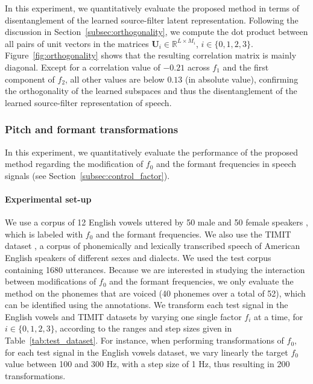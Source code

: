 \documentclass[review]{elsarticle}
\begin{document}
In this experiment, we quantitatively evaluate the proposed method in terms of disentanglement of the learned source-filter latent representation. Following the discussion in Section~\ref{subsec:orthogonality}, we compute the dot product between all pairs of unit vectors in the matrices $\mathbf{U}_i \in \mathbb{R}^{L \times M_i}$, $i \in \{0,1,2, 3\}$. Figure~\ref{fig:orthogonality} shows that the resulting correlation matrix is mainly diagonal. Except for a correlation value of $-0.21$ across $f_1$ and the first component of $f_2$, all other values are below $0.13$ (in absolute value), confirming the orthogonality of the learned subspaces and thus the disentanglement of the learned source-filter representation of speech.

\subsubsection{Pitch and formant transformations} 
\label{Experimental}

In this experiment, we quantitatively evaluate the performance of the proposed method regarding the modification of $f_0$ and the formant frequencies in speech signals (see Section~\ref{subsec:control_factor}).

\paragraph{Experimental set-up}  We use a corpus of 12 English vowels uttered by 50 male and 50 female speakers \citep{hillenbrand1995acoustic}, which is labeled with $f_0$ and the formant frequencies. We also use the TIMIT dataset \citep{TIMIT}, a corpus of phonemically and lexically transcribed speech of American English speakers of different sexes and dialects. We used the test corpus containing 1680 utterances. Because we are interested in studying the interaction between modifications of $f_0$ and the formant frequencies, we only evaluate the method on the phonemes that are voiced (40 phonemes over a total of 52), which can be identified using the annotations. We transform each test signal in the English vowels and TIMIT datasets by varying one single factor $f_i$ at a time, for $i \in \{0,1,2,3\}$, according to the ranges and step sizes given in Table~\ref{tab:test_dataset}. For instance, when performing transformations of $f_0$, for each test signal in the English vowels dataset, we vary linearly the target $f_0$ value between 100 and 300 Hz, with a step size of 1 Hz, thus resulting in 200 transformations.
\end{document}
